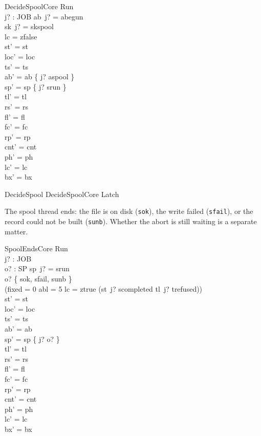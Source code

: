 \documentclass[a4paper,10pt,fleqn]{article}
\newcommand{\field}[1]{\texttt{#1}}
\begin{document}
\begin{schema}{DecideSpoolCore}
\Delta Run \\ j? : JOB
\where
ab~j? = abegun \\
sk~j? = skspool \\
lc = zfalse \\
st' = st \\
loc' = loc \\
ts' = ts \\
ab' = ab \oplus \{ j? \mapsto aspool \} \\
sp' = sp \oplus \{ j? \mapsto srun \} \\
tl' = tl \\
rs' = rs \\
fl' = fl \\
fc' = fc \\
rp' = rp \\
cnt' = cnt \\
ph' = ph \\
lc' = lc \\
bx' = bx
\end{schema}

\begin{zed}
DecideSpool  DecideSpoolCore \land Latch
\end{zed}

The spool thread ends: the file is on disk (\field{sok}), the write failed
(\field{sfail}), or the record could not be built (\field{sunb}). Whether the
abort is still waiting is a separate matter.

\begin{schema}{SpoolEndsCore}
\Delta Run \\ j? : JOB \\ o? : SP
\where
sp~j? = srun \\
o? \in \{ sok, sfail, sunb \} \\
(fixed = 0 \lor abl = 5 \lor lc = ztrue \lor (st~j? \neq scompleted \land tl~j? \neq trefused)) \\
st' = st \\
loc' = loc \\
ts' = ts \\
ab' = ab \\
sp' = sp \oplus \{ j? \mapsto o? \} \\
tl' = tl \\
rs' = rs \\
fl' = fl \\
fc' = fc \\
rp' = rp \\
cnt' = cnt \\
ph' = ph \\
lc' = lc \\
bx' = bx
\end{schema}
\end{document}
